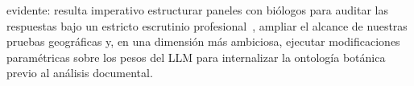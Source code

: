 \documentclass[runningheads]{llncs}
\begin{document}
evidente: resulta imperativo estructurar paneles con bi\'{o}logos para auditar las respuestas bajo un estricto escrutinio profesional~\cite{heinrich2020ethnopharmacology}, ampliar el alcance de nuestras pruebas geogr\'{a}ficas y, en una dimensi\'{o}n m\'{a}s ambiciosa, ejecutar modificaciones param\'{e}tricas sobre los pesos del LLM para internalizar la ontolog\'{i}a bot\'{a}nica previo al an\'{a}lisis documental.




\end{document}
